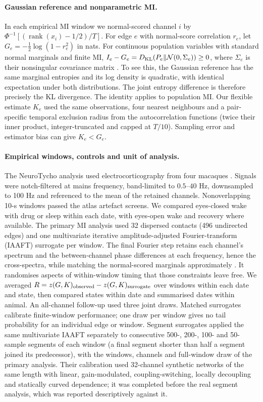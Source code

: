 \paragraph{Gaussian reference and nonparametric MI.}
In each empirical MI window we normal-scored channel $i$ by $\Phi^{-1}[(\operatorname{rank}(x_i)-1/2)/T]$. For edge $e$ with normal-score correlation $r_e$, let $G_e=-\frac12\log(1-r_e^2)$ in nats. For continuous population variables with standard normal marginals and finite MI, $I_e-G_e=D_{\rm KL}(P_e\Vert\mathcal{N}(0,\Sigma_e))\geq0$, where $\Sigma_e$ is their nonsingular covariance matrix \cite{ince2017}. To see this, the Gaussian reference has the same marginal entropies and its log density is quadratic, with identical expectation under both distributions. The joint entropy difference is therefore precisely the KL divergence. The identity applies to population MI. Our flexible estimate $K_e$ used the same observations, four nearest neighbours and a pair-specific temporal exclusion radius from the autocorrelation functions (twice their inner product, integer-truncated and capped at $T/10$). Sampling error and estimator bias can give $K_e<G_e$.

\paragraph{Empirical windows, controls and unit of analysis.}
The NeuroTycho analysis used electrocorticography from four macaques \cite{yanagawa2013}. Signals were notch-filtered at mains frequency, band-limited to $0.5$--$40$ Hz, downsampled to 100 Hz and referenced to the mean of the retained channels. Nonoverlapping 10-s windows passed the atlas artefact screens. We compared eyes-closed wake with drug or sleep within each date, with eyes-open wake and recovery where available. The primary MI analysis used 32 dispersed contacts (496 undirected edges) and one multivariate iterative amplitude-adjusted Fourier-transform (IAAFT) surrogate per window. The final Fourier step retains each channel's spectrum and the between-channel phase differences at each frequency, hence the cross-spectra, while matching the normal-scored marginals approximately \cite{prichard1994generating,schreiber2000surrogate}. It randomises aspects of within-window timing that those constraints leave free. We averaged $R=z(G,K)_{\rm observed}-z(G,K)_{\rm surrogate}$ over windows within each date and state, then compared states within date and summarised dates within animal. An all-channel follow-up used three joint draws. Matched surrogates calibrate finite-window performance; one draw per window gives no tail probability for an individual edge or window. Segment surrogates applied the same multivariate IAAFT separately to consecutive 500-, 200-, 100- and 50-sample segments of each window (a final segment shorter than half a segment joined its predecessor), with the windows, channels and full-window draw of the primary analysis. Their calibration used 32-channel synthetic networks of the same length with linear, gain-modulated, coupling-switching, locally decoupling and statically curved dependence; it was completed before the real segment analysis, which was reported descriptively against it.

